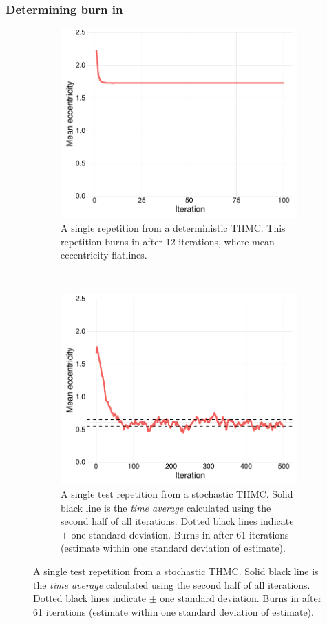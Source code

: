 \documentclass[preprint, 12pt]{elsarticle}
\begin{document}
\subsubsection{Determining burn in}

\begin{figure}[ht!]
	\caption{Example of trace plots.}
	\centering
	\begin{subfigure}[t]{0.485\textwidth}
		\includegraphics[width=\textwidth]{Graphics/figb21a.pdf}
		\caption{A single repetition from a deterministic THMC. This repetition burns in after 12 iterations, where mean eccentricity flatlines.}
		\label{fig:deterministic}
	\end{subfigure}
	~
	\begin{subfigure}[t]{0.485\textwidth}
		\includegraphics[width=\textwidth]{Graphics/figb22a.pdf}
		\caption{A single test repetition from a stochastic THMC. Solid black line is the \emph{time average} calculated using the second half of all iterations. Dotted black lines indicate $\pm$ one standard deviation. Burns in after 61 iterations (estimate within one standard deviation of estimate).}
		\label{fig:stochastic}
	\end{subfigure}
	\label{fig:traceplots}
\end{figure}
\end{document}
